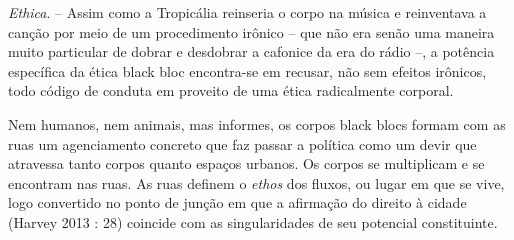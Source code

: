 \emph{Ethica}. -- Assim como a Tropicália reinseria o corpo na música e
reinventava a canção por meio de um procedimento irônico -- que não era
senão uma maneira muito particular de dobrar e desdobrar a cafonice da
era do rádio --, a potência específica da ética black bloc encontra-se
em recusar, não sem efeitos irônicos, todo código de conduta em proveito
de uma ética radicalmente corporal.

Nem humanos, nem animais, mas informes, os corpos black blocs formam com
as ruas um agenciamento concreto que faz passar a política como um devir
que atravessa tanto corpos quanto espaços urbanos. Os corpos se
multiplicam e se encontram nas ruas. As ruas definem o \emph{ethos }dos
fluxos, ou lugar em que se vive, logo convertido no ponto de junção em
que a afirmação do direito à cidade (Harvey 2013 : 28) coincide com as
singularidades de seu potencial constituinte.

